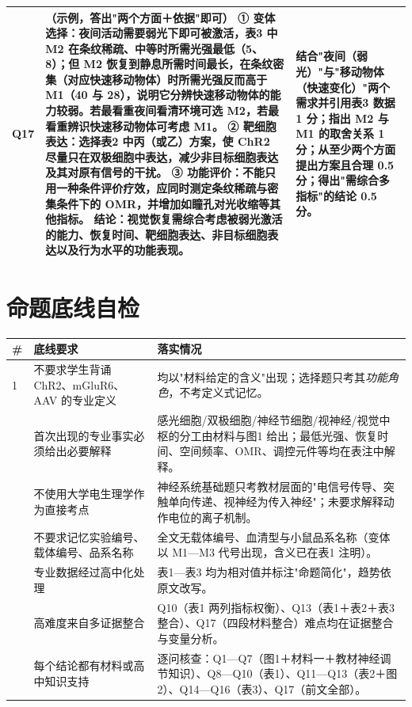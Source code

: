 \documentclass[UTF8,a4paper,11pt]{ctexart}
\begin{document}
\begin{longtable}{@{}p{0.85cm}p{9.7cm}p{4.2cm}@{}}
\addlinespace
Q17 & \textbf{（示例，答出"两个方面＋依据"即可）}\newline
\textbf{① 变体选择}：夜间活动需要弱光下即可被激活，表3 中 M2 在条纹稀疏、中等时所需光强最低（5、8）；但 M2 恢复到静息所需时间最长，在条纹密集（对应快速移动物体）时所需光强反而高于 M1（40 与 28），说明它分辨快速移动物体的能力较弱。若最看重夜间看清环境可选 M2，若最看重辨识快速移动物体可考虑 M1。\newline
\textbf{② 靶细胞表达}：选择表2 中丙（或乙）方案，使 ChR2 尽量只在双极细胞中表达，减少非目标细胞表达及其对原有信号的干扰。\newline
\textbf{③ 功能评价}：不能只用一种条件评价疗效，应同时测定条纹稀疏与密集条件下的 OMR，并增加如瞳孔对光收缩等其他指标。\newline
\textbf{结论}：视觉恢复需综合考虑被弱光激活的能力、恢复时间、靶细胞表达、非目标细胞表达以及行为水平的功能表现。 & 结合"夜间（弱光）"与"移动物体（快速变化）"两个需求并引用表3 数据 1 分；指出 M2 与 M1 的取舍关系 1 分；从至少两个方面提出方案且合理 0.5 分；得出"需综合多指标"的结论 0.5 分。 \\
\bottomrule
\end{longtable}

\section*{命题底线自检}

\begin{longtable}{@{}p{0.6cm}p{6.0cm}p{8.2cm}@{}}
\toprule
\textbf{\#} & \textbf{底线要求} & \textbf{落实情况} \\
\midrule
\endhead
1 & 不要求学生背诵 ChR2、mGluR6、AAV 的专业定义 & 均以"材料给定的含义"出现；选择题只考其\emph{功能角色}，不考定义式记忆。 \\
\addlinespace
2 & 首次出现的专业事实必须给出必要解释 & 感光细胞/双极细胞/神经节细胞/视神经/视觉中枢的分工由材料与图1 给出；最低光强、恢复时间、空间频率、OMR、调控元件等均在表注中解释。 \\
\addlinespace
3 & 不使用大学电生理学作为直接考点 & 神经系统基础题只考教材层面的"电信号传导、突触单向传递、视神经为传入神经"；未要求解释动作电位的离子机制。 \\
\addlinespace
4 & 不要求记忆实验编号、载体编号、品系名称 & 全文无载体编号、血清型与小鼠品系名称（变体以 M1—M3 代号出现，含义已在表1 注明）。 \\
\addlinespace
5 & 专业数据经过高中化处理 & 表1—表3 均为相对值并标注"命题简化"，趋势依原文改写。 \\
\addlinespace
6 & 高难度来自多证据整合 & Q10（表1 两列指标权衡）、Q13（表1＋表2＋表3 整合）、Q17（四段材料整合）难点均在证据整合与变量分析。 \\
\addlinespace
7 & 每个结论都有材料或高中知识支持 & 逐问核查：Q1—Q7（图1＋材料一＋教材神经调节知识）、Q8—Q10（表1）、Q11—Q13（表2＋图2）、Q14—Q16（表3）、Q17（前文全部）。 \\
\bottomrule
\end{longtable}
\end{document}
